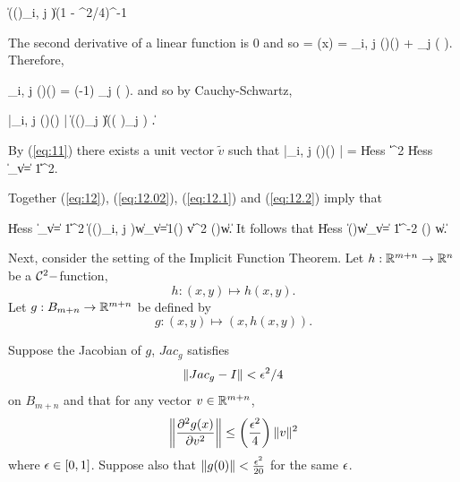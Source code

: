 \documentclass[final, 12pt]{colt2018} %
\begin{document}
\beq {} \left\| \left(\left(\right)_{i, j \in [p]}\right)\right\| \leq (1 - \eps^2/4)^{-1}\eeq

The second derivative of a linear function is $0$ and so  =  (x) =  \sum_{i, j} \left(\right)\left(\right) + \sum_j \left( \right). \eeq
Therefore, 

 \beq  \sum_{i, j} \left(\right)\left(\right) = (-1) \sum_j \left( \right). \eeq
and so by Cauchy-Schwartz, 

\beq{}  \left|\sum_{i, j} \left(\right)\left(\right) \right| \leq \left \| \left(\left(\right)_{j \in [p]}\right)\right\| \left\| \left(\left( \right)_{j \in [p]}\right) \right\|. \eeq

By (\ref{eq:11}) there exists a unit vector $\tilde{v}$ such that 
\beq{} \left|\sum_{i, j} \left(\right)\left(\right) \right| =  \left\|Hess\, \right\|  \left\|\right\|^2 \geq  \left\|Hess\, \right\|  \inf \limits_{\|v\| = 1}\left\|\right\|^2. \eeq 

Together (\ref{eq:12}), (\ref{eq:12.02}), (\ref{eq:12.1}) and (\ref{eq:12.2}) imply that 

\beq \left\|Hess\, \right\|  \inf \limits_{\|v\| = 1}\left\|\right\|^2 \leq \left\|\left(\left(\right)_{i, j \in [p]}\right)w\right\| \sup\limits_{\|v\|=1}\left(\right) \|v\|^2 \leq \left(\right)\|w\|. \eeq
It follows that 
\beq \left\|Hess\, \right\|  \leq \left(\right)\|w\| \sup \limits_{\|v\| = 1}\left\|\right\|^{-2} \leq \left(\right) \|w\|. \eeq

Next, consider the setting of the Implicit Function Theorem. Let $h: \mathbb R^{m+n} \rightarrow \mathbb R^n$ be a $\mathcal{C}^2-$function,
$$ h:(x, y) \mapsto h(x, y).$$
Let $g:B_{m+n} \rightarrow \mathbb R^{m+n}$ be defined by $$g:(x, y) \mapsto (x, h(x, y)).$$

 Suppose the Jacobian of  $g$, $Jac_g$ satisfies $$\left\|Jac_g - I\right\| < {\epsilon}^2/4$$ on $B_{m+n}$ and that for any vector $v \in \mathbb R^{m+n}$, $$\left\|\frac{\partial^2 g(x)}{\partial v ^2}\right\| \leq \left(\frac{{\epsilon}^2}{4}\right)\|v\|^2$$ where ${\epsilon} \in [0, 1]$.
Suppose also that $\|g(0)\| < \frac{{\epsilon}^2}{20}$ for the same ${\epsilon}$.
\end{document}
